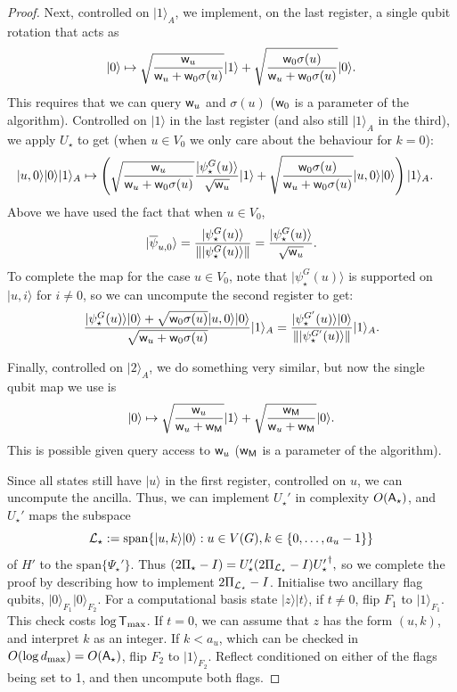 \documentclass{article}
\def\ket#1{{\lvert}#1\rangle}
\renewcommand{\>}{\rangle}
\newcommand{\<}{\langle}
\renewcommand{\(}{\left(}
\renewcommand{\)}{\right)}
\def\norm#1{\left\| #1 \right\|}
\def\w{{\sf w}}
\begin{document}
\begin{proof}
\noindent Next, controlled on $\ket{1}_A$, we implement, on the last register, a single qubit rotation that acts as 
$$\ket{0}\mapsto \sqrt{\frac{\w_u}{\w_u+\w_0\sigma(u)}}\ket{1}+\sqrt{\frac{\w_0\sigma(u)}{\w_u+\w_0\sigma(u)}}\ket{0}.$$
This requires that we can query $\w_u$ and $\sigma(u)$ ($\w_0$ is a parameter of the algorithm).
Controlled on $\ket{1}$ in the last register (and also still $\ket{1}_A$ in the third), we apply $U_\star$ to get (when $u\in V_0$ we only care about the behaviour for $k=0$):
\begin{align*}
\ket{u,0}\ket{0}\ket{1}_A &\mapsto \left(\sqrt{\frac{\w_u}{\w_u+\w_0\sigma(u)}}\frac{\ket{\psi_\star^G(u)}}{\sqrt{\w_u}}\ket{1}+\sqrt{\frac{\w_0\sigma(u)}{\w_u+\w_0\sigma(u)}}\ket{u,0}\ket{0}\right)\ket{1}_A.
\end{align*}
Above we have used the fact that when $u\in V_0$,
$$\ket{\overline{\psi}_{u,0}}=\frac{\ket{\psi_{\star}^G(u)}}{\norm{\ket{\psi_{\star}^G(u)}}}=\frac{\ket{\psi_{\star}^G(u)}}{\sqrt{\w_u}}.$$
To complete the map for the case $u\in V_0$, note that $\ket{\psi_\star^G(u)}$ is supported on $\ket{u,i}$ for $i\neq 0$, so we can uncompute the second register to get:
\begin{align*}
\frac{\ket{\psi_\star^G(u)}\ket{0}+\sqrt{\w_0\sigma(u)}\ket{u,0}\ket{0}}{\sqrt{\w_u+\w_0\sigma(u)}}\ket{1}_A
=\frac{\ket{\psi_\star^{G'}(u)}\ket{0}}{\norm{\ket{\psi_\star^{G'}(u)}}}\ket{1}_A.
\end{align*}

Finally, controlled on $\ket{2}_A$, we do something very similar, but now the single qubit map we use is
$$\ket{0}\mapsto \sqrt{\frac{\w_u}{\w_u+\w_{\sf M}}}\ket{1}+\sqrt{\frac{\w_{\sf M}}{\w_u+\w_{\sf M}}}\ket{0}.$$
This is possible given query access to $\w_u$ ($\w_{\sf M}$ is a parameter of the algorithm). 

Since all states still have $\ket{u}$ in the first register, controlled on $u$, we can uncompute the ancilla. Thus, we can implement $U_\star'$ in complexity $O({\sf A}_\star)$, and $U_\star'$ maps the subspace
$${\cal L}_\star:=\mathrm{span}\{\ket{u,k}\ket{0}:u\in V(G),k\in\{0,\dots,a_u-1\}\}$$                                                                                                                                                                                        
of $H'$ to the $\mathrm{span}\{\Psi_\star'\}$. Thus
$(2\Pi_\star-I) = U_\star' (2\Pi_{{\cal L}_\star}-I) {U_\star'}^\dagger,$
so we complete the proof by describing how to implement $2\Pi_{{\cal L}_\star}-I$. Initialise two ancillary flag qubits, $\ket{0}_{F_1}\ket{0}_{F_2}$. For a computational basis state $\ket{z}\ket{t}$, if $t\neq 0$, flip $F_1$ to $\ket{1}_{F_1}$. This check costs $\log{\sf T}_{\max}$. If $t=0$, we can assume that $z$ has the form $(u,k)$, and interpret $k$ as an integer. If $k<a_u$, which can be checked in $O(\log d_{\max})=O({\sf A}_\star)$, flip $F_2$ to $\ket{1}_{F_2}$. Reflect conditioned on either of the flags being set to 1, and then uncompute both flags. 
\end{proof}
\end{document}
